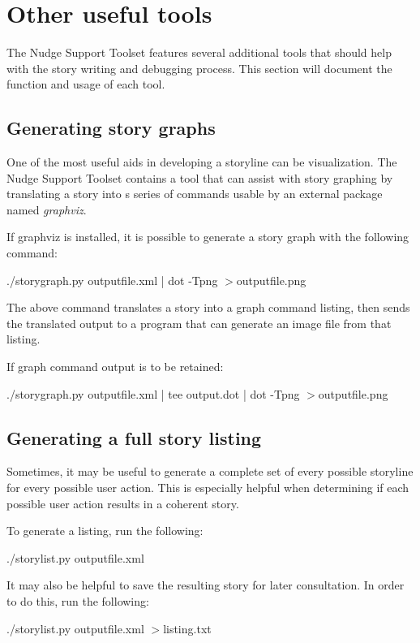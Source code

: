 \documentclass[12pt,letterpaper]{article}
\begin{document}
\section{Other useful tools}
The Nudge Support Toolset features several additional tools that should help with the story writing and debugging process. This section will document the function and
usage of each tool.

\subsection{Generating story graphs}
One of the most useful aids in developing a storyline can be visualization. The Nudge Support Toolset contains a tool that can assist with story graphing by 
translating a story into s series of commands usable by an external package named \textit{graphviz}.

If graphviz is installed, it is possible to generate a story graph with the following command:
\begin{center}
./storygraph.py outputfile.xml | dot -Tpng $>$outputfile.png
\end{center}

The above command translates a story into a graph command listing, then sends the translated output to a program that can generate an image file from that listing.

If graph command output is to be retained:
\begin{center}
./storygraph.py outputfile.xml | tee output.dot | dot -Tpng $>$outputfile.png
\end{center}

\subsection{Generating a full story listing}
Sometimes, it may be useful to generate a complete set of every possible storyline for every possible user action. This is especially helpful when determining
if each possible user action results in a coherent story.

To generate a listing, run the following:
\begin{center}
./storylist.py outputfile.xml
\end{center}

It may also be helpful to save the resulting story for later consultation. In order to do this, run the following:
\begin{center}
./storylist.py outputfile.xml $>$listing.txt
\end{center}
\end{document}

